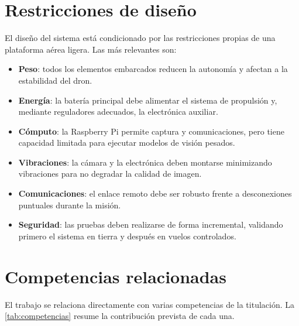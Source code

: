 \section{Restricciones de diseño}
\label{sec:restricciones-diseno}

El diseño del sistema está condicionado por las restricciones propias de una plataforma aérea ligera. Las más relevantes son:

\begin{itemize}
\item \textbf{Peso}: todos los elementos embarcados reducen la autonomía y afectan a la estabilidad del dron.
\item \textbf{Energía}: la batería principal debe alimentar el sistema de propulsión y, mediante reguladores adecuados, la electrónica auxiliar.
\item \textbf{Cómputo}: la Raspberry Pi permite captura y comunicaciones, pero tiene capacidad limitada para ejecutar modelos de visión pesados.
\item \textbf{Vibraciones}: la cámara y la electrónica deben montarse minimizando vibraciones para no degradar la calidad de imagen.
\item \textbf{Comunicaciones}: el enlace remoto debe ser robusto frente a desconexiones puntuales durante la misión.
\item \textbf{Seguridad}: las pruebas deben realizarse de forma incremental, validando primero el sistema en tierra y después en vuelos controlados.
\end{itemize}

\section{Competencias relacionadas}
\label{sec:competencias-relacionadas}

El trabajo se relaciona directamente con varias competencias de la titulación. La \autoref{tab:competencias} resume la contribución prevista de cada una.

